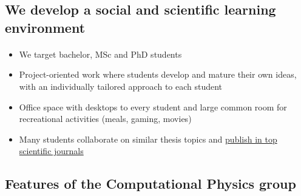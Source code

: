\documentclass[%
twoside,                 %
final,                   %
10pt]{article}
\begin{document}
\noindent





\subsection*{We develop a social and scientific learning environment}


\paragraph{}
\begin{itemize}
\item We target bachelor, MSc and PhD students

\item Project-oriented work where students develop and mature their own ideas, with an individually tailored approach to each student

\item Office space with desktops to every student and large common room for recreational activities (meals, gaming, movies)

\item Many students collaborate on similar  thesis topics and \href{{http://www.dn.no/talent/2014/06/12/Utdannelse/sommervikar-ble-toppforsker}}{publish in top scientific journals}
\end{itemize}

\noindent





\subsection*{Features of the Computational Physics group}

\end{document}

